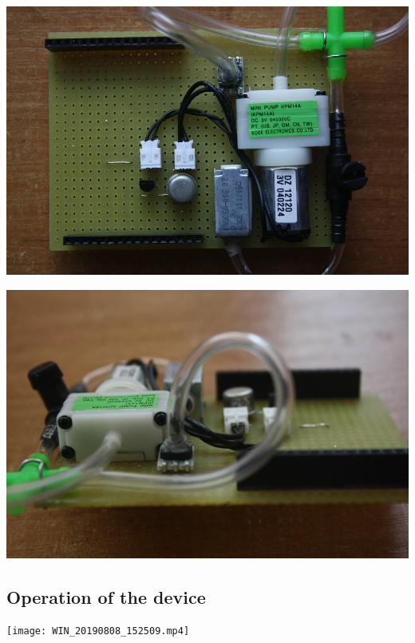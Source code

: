 \begin{DoxyImage}
\includegraphics[width=\textwidth,height=\textheight/2,keepaspectratio=true]{IMG_4842.png}
\end{DoxyImage}



\begin{DoxyImage}
\includegraphics[width=\textwidth,height=\textheight/2,keepaspectratio=true]{IMG_4807.png}
\end{DoxyImage}


\subsection*{Operation of the device}


\begin{DoxyImage}
\texttt{[image: WIN\_20190808\_152509.mp4]}
\end{DoxyImage}


